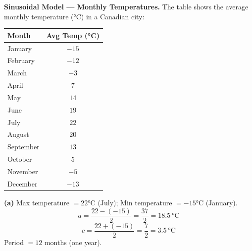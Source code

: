 \documentclass[addpoints]{exam}
\begin{document}
\begin{questions}
\vspace{5mm}

\question[8]
\textbf{Sinusoidal Model --- Monthly Temperatures.}
The table shows the average monthly temperature (°C) in a Canadian city:

\begin{center}
\begin{tabular}{@{}lc@{}}
\toprule
Month & Avg Temp (°C) \\
\midrule
January   & $-15$ \\
February  & $-12$ \\
March     & $-3$ \\
April     & $7$ \\
May       & $14$ \\
June      & $19$ \\
July      & $22$ \\
August    & $20$ \\
September & $13$ \\
October   & $5$ \\
November  & $-5$ \\
December  & $-13$ \\
\bottomrule
\end{tabular}
\end{center}


\begin{solution}
\textbf{(a)}
Max temperature $= 22$°C (July); Min temperature $= -15$°C (January).
\[
a = \frac{22-(-15)}{2} = \frac{37}{2} = 18.5\ \text{°C}
\]
\[
c = \frac{22+(-15)}{2} = \frac{7}{2} = 3.5\ \text{°C}
\]
Period $= 12$ months (one year).


\end{solution}
\end{questions}
\end{document}

